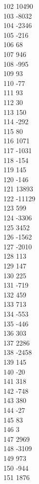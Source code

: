 { 102	10490 \\
 103	-8032 \\
 104	-2346 \\
 105	-216 \\
 106	68 \\
 107	946 \\
 108	-995 \\
 109	93 \\
 110	-77 \\
 111	93 \\
 112	30 \\
 113	150 \\
 114	-292 \\
 115	80 \\
 116	1071 \\
 117	-1031 \\
 118	-154 \\
 119	145 \\
 120	-146 \\
 121	13893 \\
 122	-11129 \\
 123	599 \\
 124	-3306 \\
 125	3452 \\
 126	-1562 \\
 127	-2010 \\
 128	113 \\
 129	147 \\
 130	225 \\
 131	-719 \\
 132	459 \\
 133	713 \\
 134	-553 \\
 135	-446 \\
 136	303 \\
 137	2286 \\
 138	-2458 \\
 139	145 \\
 140	-20 \\
 141	318 \\
 142	-748 \\
 143	380 \\
 144	-27 \\
 145	83 \\
 146	3 \\
 147	2969 \\
 148	-3109 \\
 149	973 \\
 150	-944 \\
 151	1876 \\
}
